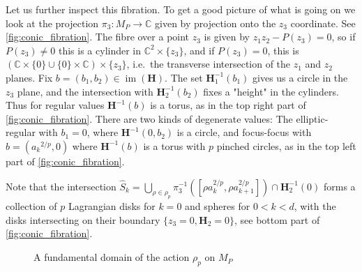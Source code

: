 \documentclass[12pt,a4paper,draft]{scrartcl}
\DeclareMathOperator{\im}{im}
\begin{document}
Let us further inspect this fibration. To get a good picture of what is going on we look at the projection $π_3 \colon M_P → ℂ$ given by projection onto the $z_3$ coordinate.
See \cref{fig:conic_fibration}.
The fibre over a point $z_3$ is given by $z_1 z_2 - P(z_3) = 0$, so if $P(z_3) ≠ 0$ this is a cylinder in $ℂ^2 × \{z_3\}$, and if $P(z_3) = 0$, this is $(ℂ × \{0\} ∪ \{0\} × ℂ) × \{z_3\}$, i.e.\ the transverse intersection of the $z_1$ and $z_2$ planes.
Fix $b = (b_1,b_2) ∈ \im(\symbf{H})$. The set $\symbf{H}_1^{-1}(b_1)$ gives us a circle in the $z_3$ plane, and the intersection with $\symbf{H}_2^{-1}(b_2)$ fixes a "height" in the cylinders.
Thus for regular values $\symbf{H}^{-1}(b)$ is a torus, as in the top right part of \cref{fig:conic_fibration}.
There are two kinds of degenerate values: The elliptic-regular with $b_1=0$, where $\symbf{H}^{-1}(0,b_2)$ is a circle, and focus-focus with $b = ({a_k}^{2/p},0)$ where $\symbf{H}^{-1}(b)$ is a torus with $p$ pinched circles, as in the top left part of \cref{fig:conic_fibration}.

Note that the intersection $\hat{S}_k = ⋃_{ρ ∈ ρ_p} π_3^{-1}([ρ a_k^{2/p},ρ a_{k+1}^{2/p}]) ∩ \symbf{H}_2^{-1}(0)$ forms a collection of $p$ Lagrangian disks for $k=0$ and spheres for $0<k<d$, with the disks intersecting on their boundary $\{z_3=0,\symbf{H}_2=0\}$, see bottom part of \cref{fig:conic_fibration}.

\begin{figure}
  \centering
  \caption{A fundamental domain of the action $ρ_p$ on $M_P$}
  \label{fig:conic_fibration_fundamental_domain}
\end{figure}
\end{document}
